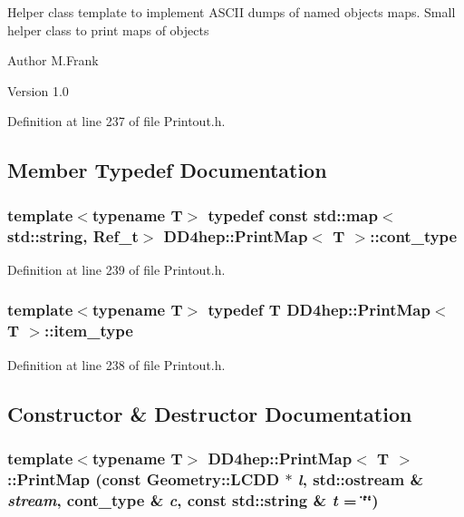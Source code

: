 Helper class template to implement ASCII dumps of named objects maps. Small helper class to print maps of objects

\begin{DoxyAuthor}{Author}
M.Frank 
\end{DoxyAuthor}
\begin{DoxyVersion}{Version}
1.0 
\end{DoxyVersion}


Definition at line 237 of file Printout.h.

\subsection{Member Typedef Documentation}
\hypertarget{struct_d_d4hep_1_1_print_map_a75356a94ee86763170e76a2096ec4cb5}{
\subsubsection[{cont\_\-type}]{\setlength{\rightskip}{0pt plus 5cm}template$<$typename T$>$ typedef const std::map$<$std::string, {\bf Ref\_\-t}$>$ {\bf DD4hep::PrintMap}$<$ {\bf T} $>$::{\bf cont\_\-type}}}
\label{struct_d_d4hep_1_1_print_map_a75356a94ee86763170e76a2096ec4cb5}


Definition at line 239 of file Printout.h.\hypertarget{struct_d_d4hep_1_1_print_map_a8d784c171bb184d181296a306cd1301d}{
\subsubsection[{item\_\-type}]{\setlength{\rightskip}{0pt plus 5cm}template$<$typename T$>$ typedef {\bf T} {\bf DD4hep::PrintMap}$<$ {\bf T} $>$::{\bf item\_\-type}}}
\label{struct_d_d4hep_1_1_print_map_a8d784c171bb184d181296a306cd1301d}


Definition at line 238 of file Printout.h.

\subsection{Constructor \& Destructor Documentation}
\hypertarget{struct_d_d4hep_1_1_print_map_a5e9d6107e83c34022dd352fc04cf346a}{
\subsubsection[{PrintMap}]{\setlength{\rightskip}{0pt plus 5cm}template$<$typename T$>$ {\bf DD4hep::PrintMap}$<$ {\bf T} $>$::{\bf PrintMap} (const {\bf Geometry::LCDD} $\ast$ {\em l}, \/  std::ostream \& {\em stream}, \/  {\bf cont\_\-type} \& {\em c}, \/  const std::string \& {\em t} = {\ttfamily \char`\"{}\char`\"{}})}}
\label{struct_d_d4hep_1_1_print_map_a5e9d6107e83c34022dd352fc04cf346a}


